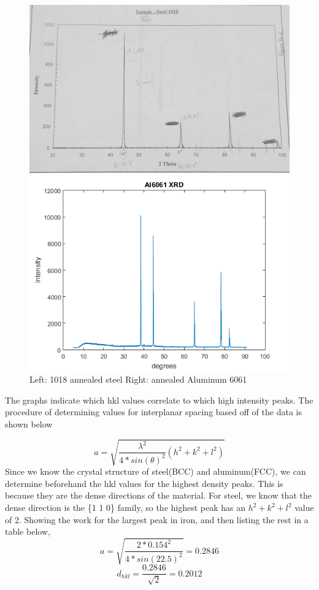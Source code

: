 \documentclass{article}
\begin{document}
\begin{figure}[h]
	\begin{minipage}{.5\textwidth}
		\centering
		\includegraphics[scale=.06]{SteelXRD.jpg}
	\end{minipage}		
	\begin{minipage}{.5\textwidth}
		\centering
		\includegraphics[scale=.3]{ALXRD.png}
	\end{minipage}
	\caption{Left: 1018 annealed steel Right: annealed Aluminum 6061}
\end{figure}

The graphs indicate which hkl values correlate to which high intensity peaks. The procedure of determining values for interplanar spacing based off of the data is shown below

$$a = \sqrt{\frac{\lambda ^2}{4*sin(\theta)^2}(h^2+k^2+l^2)}$$
Since we know the crystal structure of steel(BCC) and aluminum(FCC), we can determine beforehand the hkl values for the highest density peaks. This is because they are the dense directions of the material. For steel, we know that the dense direction is the \{1 1 0\} family, so the highest peak has an $h^2+k^2+l^2$ value of 2. Showing the work for the largest peak in iron, and then listing the rest in a table below,
$$a = \sqrt{\frac{2*0.154^2}{4*sin(22.5)^2}} = 0.2846$$
$$d_{hkl} = \frac{0.2846}{\sqrt{2}} = 0.2012$$
\end{document}
